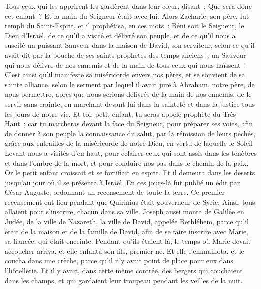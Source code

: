 \begin{multicols}{2}
Tous ceux qui les apprirent les gardèrent dans leur cœur, disant~: Que sera donc cet enfant~? Et la main du Seigneur était avec lui.
Alors Zacharie, son père, fut rempli du Saint-Esprit, et il prophétisa, en ces mots~:
Béni soit le Seigneur, le Dieu d'Israël, de ce qu'il a visité et délivré son peuple,
et de ce qu'il nous a suscité un puissant Sauveur dans la maison de David, son serviteur,
selon ce qu'il avait dit par la bouche de ses saints prophètes des temps anciens~;
un Sauveur qui nous délivre de nos ennemis et de la main de tous ceux qui nous haïssent~!
C'est ainsi qu'il manifeste sa miséricorde envers nos pères, et se souvient de sa sainte alliance,
selon le serment par lequel il avait juré à Abraham, notre père,
de nous permettre, après que nous serions délivrés de la main de nos ennemis, de le servir sans crainte,
en marchant devant lui dans la sainteté et dans la justice tous les jours de notre vie.
Et toi, petit enfant, tu seras appelé prophète du Très-Haut~; car tu marcheras devant la face du Seigneur, pour préparer ses voies,
afin de donner à son peuple la connaissance du salut, par la rémission de leurs péchés,
grâce aux entrailles de la miséricorde de notre Dieu, en vertu de laquelle le Soleil Levant nous a visités d'en haut,
pour éclairer ceux qui sont assis dans les ténèbres et dans l'ombre de la mort, et pour conduire nos pas dans le chemin de la paix.
Or le petit enfant croissait et se fortifiait en esprit. Et il demeura dans les déserts jusqu'au jour où il se présenta à Israël.
\VerseOne{}En ces jours-là fut publié un édit par César Auguste, ordonnant un recensement de toute la terre.
Ce premier recensement eut lieu pendant que Quirinius était gouverneur de Syrie.
Ainsi, tous allaient pour s'inscrire, chacun dans sa ville.
Joseph aussi monta de Galilée en Judée, de la ville de Nazareth, la ville de David, appelée Bethléhem, parce qu'il était de la maison et de la famille de David,
afin de se faire inscrire avec Marie, sa fiancée, qui était enceinte.
Pendant qu'ils étaient là, le temps où Marie devait accoucher arriva,
et elle enfanta son fils, premier-né. Et elle l'emmaillota, et le coucha dans une crèche, parce qu'il n'y avait point de place pour eux dans l'hôtellerie.
Et il y avait, dans cette même contrée, des bergers qui couchaient dans les champs, et qui gardaient leur troupeau pendant les veilles de la nuit.

\end{multicols}
